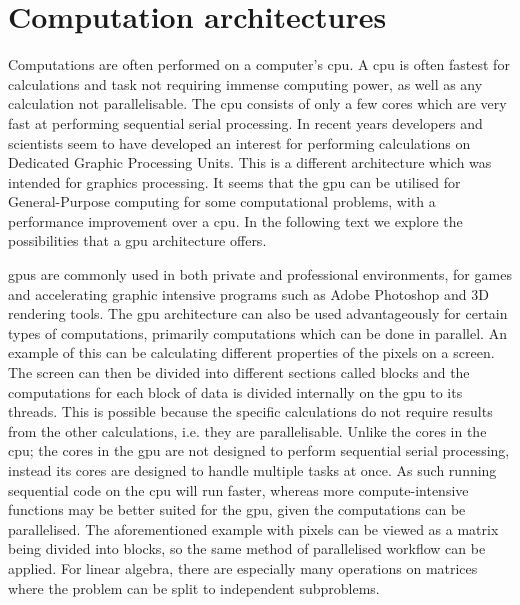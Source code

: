 \section{Computation architectures}
\label{sec:comparch}
Computations are often performed on a computer's  \acrshort{cpu}.
A \acrshort{cpu} is often fastest for calculations and task not requiring immense computing power, as well as any calculation not parallelisable.
The \acrshort{cpu} consists of only a few cores which are very fast at performing sequential serial processing.\citep{whatisgpu}
In recent years developers and scientists seem to have developed an interest for performing calculations on Dedicated Graphic Processing Units. \citep{gpurise}
This is a different architecture which was intended for graphics processing.
It seems that the \acrshort{gpu} can be utilised for General-Purpose computing for some computational problems, with a performance improvement over a \acrshort{cpu}.
In the following text we explore the possibilities that a \acrshort{gpu} architecture offers.

\acrshort{gpu}s are commonly used in both private and professional environments, for games and accelerating graphic intensive programs such as Adobe Photoshop and 3D rendering tools.\citep{NVIDIAADOBE,STEAMHW}
The \acrshort{gpu} architecture can also be used advantageously for certain types of computations, primarily computations which can be done in parallel. 
An example of this can be calculating different properties of the pixels on a screen. 
The screen can then be divided into different sections called blocks and the computations for each block of data is divided internally on the \acrshort{gpu} to its threads.
This is possible because the specific calculations do not require results from the other calculations, i.e. they are parallelisable.
Unlike the cores in the \acrshort{cpu}; the cores in the \acrshort{gpu} are not designed to perform sequential serial processing, instead its cores are designed to handle multiple tasks at once. 
As such running sequential code on the \acrshort{cpu} will run faster, whereas more compute-intensive functions may be better suited for the \acrshort{gpu}, given the computations can be parallelised.\citep{NvidiaGPGPU}
The aforementioned example with pixels can be viewed as a matrix being divided into blocks, so the same method of parallelised workflow can be applied. 
For linear algebra, there are especially many operations on matrices where the problem can be split to independent subproblems.

